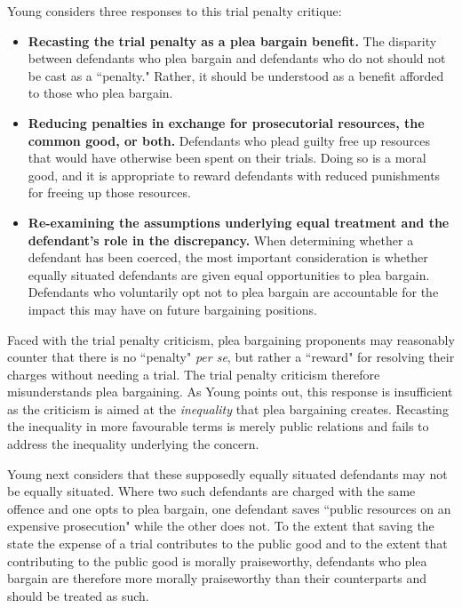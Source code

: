 Young considers three responses to this trial penalty critique:

\begin{itemize}
    \item \textbf{Recasting the trial penalty as a plea bargain benefit.} The disparity between defendants who plea bargain and defendants who do not should not be cast as a ``penalty." Rather, it should be understood as a benefit afforded to those who plea bargain.
    \item \textbf{Reducing penalties in exchange for prosecutorial resources, the common good, or both.} Defendants who plead guilty free up resources that would have otherwise been spent on their trials. Doing so is a moral good, and it is appropriate to reward defendants with reduced punishments for freeing up those resources.
    \item \textbf{Re-examining the assumptions underlying equal treatment and the defendant's role in the discrepancy.} When determining whether a defendant has been coerced, the most important consideration is whether equally situated defendants are given equal opportunities to plea bargain. Defendants who voluntarily opt not to plea bargain are accountable for the impact this may have on future bargaining positions.
\end{itemize}

Faced with the trial penalty criticism, plea bargaining proponents may reasonably counter that there is no ``penalty" \textit{per se}, but rather a ``reward" for resolving their charges without needing a trial. The trial penalty criticism therefore misunderstands plea bargaining. As Young points out, this response is insufficient as the criticism is aimed at the \textit{inequality} that plea bargaining creates. Recasting the inequality in more favourable terms is merely public relations and fails to address the inequality underlying the concern.

Young next considers that these supposedly equally situated defendants may not be equally situated. Where two such defendants are charged with the same offence and one opts to plea bargain, one defendant saves ``public resources on an expensive prosecution" while the other does not. To the extent that saving the state the expense of a trial contributes to the public good and to the extent that contributing to the public good is morally praiseworthy, defendants who plea bargain are therefore more morally praiseworthy than their counterparts and should be treated as such. 


